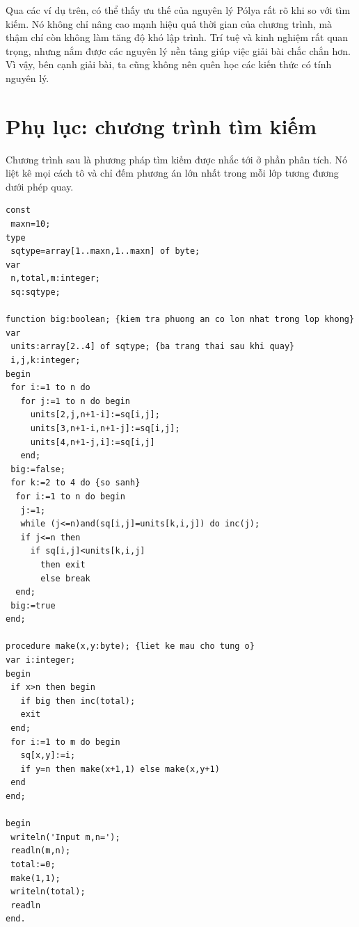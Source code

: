 \documentclass[11pt]{article}
\begin{document}
Qua các ví dụ trên, có thể thấy ưu thế của nguyên lý Pólya rất rõ khi so với
tìm kiếm. Nó không chỉ nâng cao mạnh hiệu quả thời gian của chương trình, mà
thậm chí còn không làm tăng độ khó lập trình. Trí tuệ và kinh nghiệm rất quan
trọng, nhưng nắm được các nguyên lý nền tảng giúp việc giải bài chắc chắn hơn.
Vì vậy, bên cạnh giải bài, ta cũng không nên quên học các kiến thức có tính
nguyên lý.

\section{Phụ lục: chương trình tìm kiếm}

Chương trình sau là phương pháp tìm kiếm được nhắc tới ở phần phân tích. Nó
liệt kê mọi cách tô và chỉ đếm phương án lớn nhất trong mỗi lớp tương đương
dưới phép quay.

\begin{verbatim}
const
 maxn=10;
type
 sqtype=array[1..maxn,1..maxn] of byte;
var
 n,total,m:integer;
 sq:sqtype;

function big:boolean; {kiem tra phuong an co lon nhat trong lop khong}
var
 units:array[2..4] of sqtype; {ba trang thai sau khi quay}
 i,j,k:integer;
begin
 for i:=1 to n do
   for j:=1 to n do begin
     units[2,j,n+1-i]:=sq[i,j];
     units[3,n+1-i,n+1-j]:=sq[i,j];
     units[4,n+1-j,i]:=sq[i,j]
   end;
 big:=false;
 for k:=2 to 4 do {so sanh}
  for i:=1 to n do begin
   j:=1;
   while (j<=n)and(sq[i,j]=units[k,i,j]) do inc(j);
   if j<=n then
     if sq[i,j]<units[k,i,j]
       then exit
       else break
  end;
 big:=true
end;

procedure make(x,y:byte); {liet ke mau cho tung o}
var i:integer;
begin
 if x>n then begin
   if big then inc(total);
   exit
 end;
 for i:=1 to m do begin
   sq[x,y]:=i;
   if y=n then make(x+1,1) else make(x,y+1)
 end
end;

begin
 writeln('Input m,n=');
 readln(m,n);
 total:=0;
 make(1,1);
 writeln(total);
 readln
end.
\end{verbatim}
\end{document}

